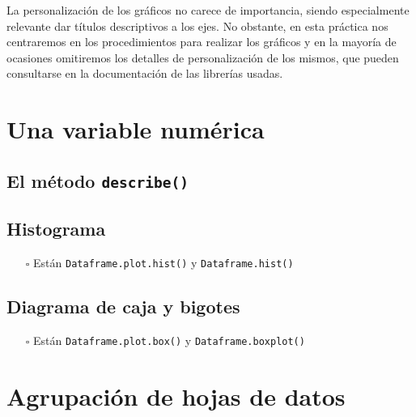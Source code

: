 \documentclass[
  a4paper,
  noprof,
  12pt,
  notoc,
  nosols,
  nobib]{mnye}
\providecommand{\tightlist}{%
  \setlength{\itemsep}{0pt}\setlength{\parskip}{0pt}}\usepackage{longtable,booktabs,array}
\theoremstyle{definition}
\theoremstyle{remark}
\begin{document}
La personalización de los gráficos no carece de importancia, siendo
especialmente relevante dar títulos descriptivos a los ejes. No
obstante, en esta práctica nos centraremos en los procedimientos para
realizar los gráficos y en la mayoría de ocasiones omitiremos los
detalles de personalización de los mismos, que pueden consultarse en la
documentación de las librerías usadas.


\hypertarget{una-variable-numuxe9rica}{%
\section{Una variable numérica}\label{una-variable-numuxe9rica}}

\hypertarget{el-muxe9todo-describe-1}{%
\subsection{\texorpdfstring{El método
\texttt{describe()}}{El método describe()}}\label{el-muxe9todo-describe-1}}

\hypertarget{histograma}{%
\subsection{Histograma}\label{histograma}}

\begin{itemize}
\tightlist
\item[$\square$]
  Están \texttt{Dataframe.plot.hist()} y \texttt{Dataframe.hist()}
\end{itemize}

\hypertarget{diagrama-de-caja-y-bigotes}{%
\subsection{Diagrama de caja y
bigotes}\label{diagrama-de-caja-y-bigotes}}

\begin{itemize}
\tightlist
\item[$\square$]
  Están \texttt{Dataframe.plot.box()} y \texttt{Dataframe.boxplot()}
\end{itemize}


\hypertarget{agrupaciuxf3n-de-hojas-de-datos}{%
\section{Agrupación de hojas de
datos}\label{agrupaciuxf3n-de-hojas-de-datos}}
\end{document}
